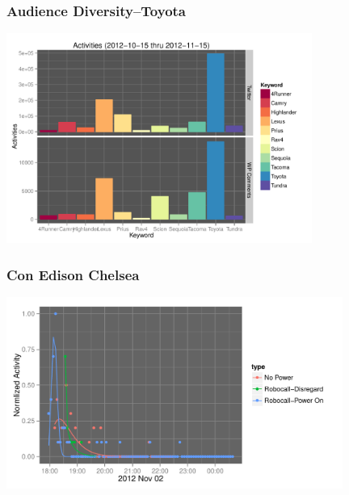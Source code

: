 \documentclass{beamer}
\begin{document}
\begin{frame}\frametitle{Audience Diversity--Toyota}
  \begin{center}
    \includegraphics[width=10cm]{./imgs/bars_twitter_wordpress.pdf}
  \end{center}
\end{frame}


\begin{frame}
\begin{center}
\end{center}
\end{frame}

%

\begin{frame}\frametitle{Con Edison Chelsea}
  \begin{center}
    \includegraphics[width=11cm]{./imgs/fake_fit2.pdf}
  \end{center}
\end{frame}
\end{document}
